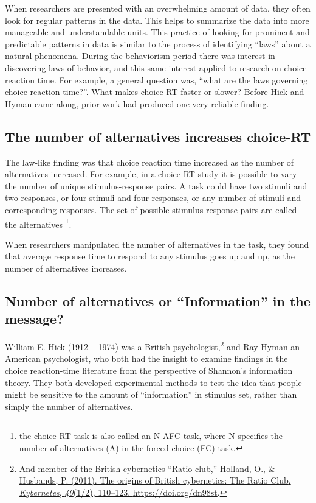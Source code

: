 \documentclass[
  oneside,
  12pt]{crumpbook}
\begin{document}
When researchers are presented with an overwhelming amount of data, they often look for regular patterns in the data. This helps to summarize the data into more manageable and understandable units. This practice of looking for prominent and predictable patterns in data is similar to the process of identifying ``laws'' about a natural phenomena. During the behaviorism period there was interest in discovering laws of behavior, and this same interest applied to research on choice reaction time. For example, a general question was, ``what are the laws governing choice-reaction time?''. What makes choice-RT faster or slower? Before Hick and Hyman came along, prior work had produced one very reliable finding.

\hypertarget{the-number-of-alternatives-increases-choice-rt}{%
\subsection{The number of alternatives increases choice-RT}\label{the-number-of-alternatives-increases-choice-rt}}

The law-like finding was that choice reaction time increased as the number of alternatives increased. For example, in a choice-RT study it is possible to vary the number of unique stimulus-response pairs. A task could have two stimuli and two responses, or four stimuli and four responses, or any number of stimuli and corresponding responses. The set of possible stimulus-response pairs are called the alternatives \footnote{the choice-RT task is also called an N-AFC task, where N specifies the number of alternatives (A) in the forced choice (FC) task.}.

When researchers manipulated the number of alternatives in the task, they found that average response time to respond to any stimulus goes up and up, as the number of alternatives increases.

\hypertarget{number-of-alternatives-or-information-in-the-message}{%
\subsection{Number of alternatives or ``Information'' in the message?}\label{number-of-alternatives-or-information-in-the-message}}

\href{https://en.wikipedia.org/wiki/W._E._Hick}{William E. Hick} (1912 -- 1974) was a British psychologist,\footnote{And member of the British cybernetics ``Ratio club,'' \protect\hyperlink{ref-hollandOriginsBritishCybernetics2011}{Holland, O., \& Husbands, P. (2011). The origins of {British} cybernetics: The {Ratio Club}. \emph{Kybernetes}, \emph{40}(1/2), 110--123. \url{https://doi.org/dn98st}}.} and \href{https://en.wikipedia.org/wiki/Ray_Hyman}{Ray Hyman} an American psychologist, who both had the insight to examine findings in the choice reaction-time literature from the perspective of Shannon's information theory. They both developed experimental methods to test the idea that people might be sensitive to the amount of ``information'' in stimulus set, rather than simply the number of alternatives.
\end{document}
